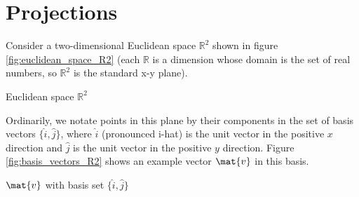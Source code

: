 \section{Projections}

Consider a two-dimensional Euclidean space $\mathbb{R}^2$ shown in figure
\ref{fig:euclidean_space_R2} (each $\mathbb{R}$ is a dimension whose domain is
the set of real numbers, so $\mathbb{R}^2$ is the standard x-y plane).
\begin{bookfigure}

  \caption{Euclidean space $\mathbb{R}^2$}
  \label{fig:euclidean_space_R2}
\end{bookfigure}

Ordinarily, we notate points in this plane by their components in the set of
basis vectors $\{\hat{i}, \hat{j}\}$, where $\hat{i}$ (pronounced i-hat) is the
unit vector in the positive $x$ direction and $\hat{j}$ is the unit vector in
the positive $y$ direction. Figure \ref{fig:basis_vectors_R2} shows an example
vector $\mat{v}$ in this basis.
\begin{bookfigure}

  \caption{$\mat{v}$ with basis set $\{\hat{i}, \hat{j}\}$}
  \label{fig:basis_vectors_R2}
\end{bookfigure}

